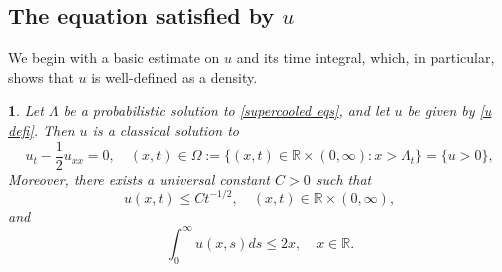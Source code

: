 \documentclass{article}
\numberwithin{equation}{section}
\numberwithin{figure}{section}
\theoremstyle{plain}
\theoremstyle{plain}
\theoremstyle{plain}
\theoremstyle{plain}
\newtheorem{lem}[thm]{\protect\lemmaname}
\theoremstyle{definition}
\theoremstyle{remark}
\def\R{{\mathbb{R}}}
\providecommand{\lemmaname}{Lemma}
\begin{document}
\subsection{The equation satisfied by $u$}
We begin with a basic estimate on $u$ and its time integral, which, in particular, shows that $u$ is well-defined as a density.
\begin{lem} \label{lem: u bound} Let $\Lambda$ be a probabilistic solution to \eqref{supercooled eqs}, and let $u$ be given by \eqref{u defi}. Then $u$ is a classical solution to
\[u_t-\frac{1}{2}u_{xx}=0, \quad(x,t)\in \Omega:=\{(x,t)\in \R\times (0,\infty): x>\Lambda_t\}=\{u>0\},\]
 Moreover, there exists a universal constant $C>0$ such that
    \begin{equation} \label{u bound}u(x,t) \leq Ct^{-1/2},  \quad (x,t)\in \R \times (0,\infty),        
    \end{equation}
    and
    \begin{equation} \label{w bound}
        \int_{0}^{\infty}u(x,s)ds \leq 2x,\quad x\in \R.
    \end{equation}
\end{lem}
\end{document}
